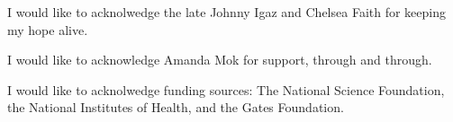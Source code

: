 \documentclass{ucbthesis}
\begin{document}
\begin{frontmatter}
\begin{acknowledgements}
I would like to acknolwedge the late Johnny Igaz and Chelsea Faith for
keeping my hope alive.


I would like to acknowledge Amanda Mok for support, through and
through.

I would like to acknolwedge funding sources: The National Science
Foundation, the National Institutes of Health, and the Gates
Foundation. 




\end{acknowledgements}

\end{frontmatter}

\pagestyle{headings}







\sloppy
\printbibliography
\begin{appendices}
  
\end{appendices}
\end{document}
